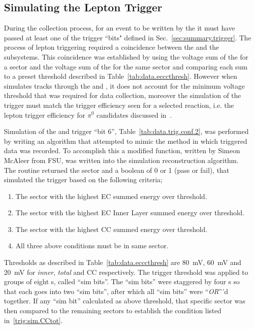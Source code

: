 \subsection{Simulating the Lepton Trigger}\label{sec:analysis.accept.trigger}
During the collection process, for an event to be written by the  it must have passed at least one of the trigger ``bits" defined in Sec.~\ref{sec:summary.trigger}. The process of lepton triggering required a coincidence between the  and the  subsystems. This coincidence was established by using the voltage sum of the  for a sector and the voltage sum of the  for the same sector and comparing each sum to a preset threshold described in Table~\ref{tab:data.ecccthresh}. However when  simulates tracks through the  and , it does not account for the minimum voltage threshold that was required for data collection, moreover the simulation of the trigger must match the trigger efficiency seen for a selected reaction, i.e. the lepton trigger efficiency for $\pi^0$ candidates discussed in~\cite{clas.thesis.kunkel}.

Simulation of the  and  trigger ``bit 6'', Table~\ref{tab:data.trig.conf.2}, was performed by writing an algorithm that attempted to mimic the method in which triggered data was recorded. To accomplish this a modified function, written by Simeon McAleer from FSU, was written into the simulation reconstruction algorithm. The routine returned the sector and a boolean of 0 or 1 (pass or fail), that simulated the trigger based on the following criteria;
\begin{enumerate}\label{trig:sim.all}
\item The sector with the highest EC summed energy over threshold. \label{trig:sim.ECtot}
\item The sector with the highest EC Inner Layer summed energy over threshold. \label{trig:sim.ECinner}
\item The sector with the highest CC summed energy over threshold. \label{trig:sim.CCtot}
\item All three above conditions must be in same sector.
\end{enumerate}
Thresholds as described in Table~\ref{tab:data.ecccthresh} are 80~mV, 60~mV and 20~mV for  \emph{inner}, \emph{total} and CC respectively. The  trigger threshold was applied to groups of eight  s, called ``sim bits''. The ``sim bits'' were staggered by four s so that each  goes into two ``sim bits'', after which all ``sim bits'' were ``\emph{OR}'''d together. If any ``sim bit'' calculated as above threshold, that specific sector was then compared to the remaining sectors to establish the condition listed in~\ref{trig:sim.CCtot}.

